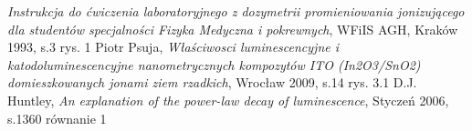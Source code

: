 \begin{thebibliography}{wstep}

  \emph{Instrukcja do ćwiczenia laboratoryjnego z dozymetrii promieniowania jonizującego dla
studentów specjalności Fizyka Medyczna i pokrewnych}, WFiIS AGH, Kraków 1993, s.3 rys. 1
Piotr Psuja,
\emph{Właściwosci luminescencyjne i katodoluminescencyjne
nanometrycznych kompozytów ITO (In2O3/SnO2)
domieszkowanych jonami ziem rzadkich}, Wrocław 2009, s.14 rys. 3.1
D.J. Huntley,
\emph{An explanation of the power-law decay of
luminescence}, Styczeń 2006, s.1360 równanie 1



\end{thebibliography}